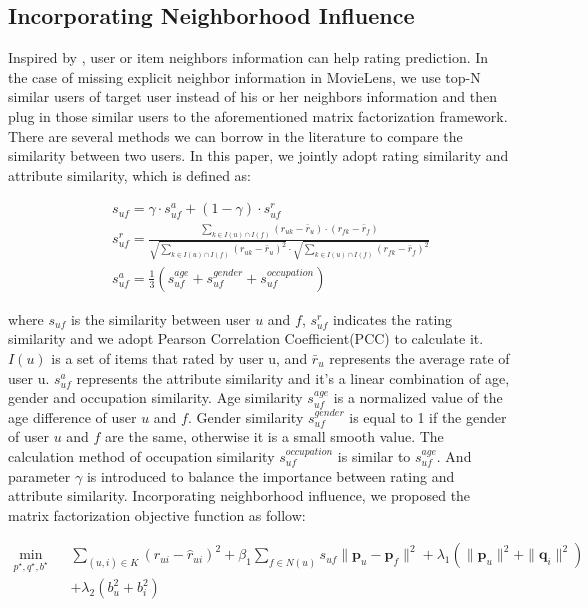 \documentclass{llncs}
\begin{document}
\subsection{Incorporating Neighborhood Influence}
	Inspired by \cite{SIGIR201301,4-2-1}, user or item neighbors information can help rating prediction.
	In the case of missing explicit neighbor information in MovieLens, we
	use top-N similar users of target user instead of his or her neighbors information and
	then plug in those similar users to the aforementioned matrix factorization framework.
	There are several methods we can borrow in the literature
	to compare the similarity between two users. In this paper,
	we jointly adopt rating similarity and attribute similarity, which is defined as:
	
\begin{eqnarray*}
		&&s_{uf}=\gamma\cdot s^a_{uf}+(1-\gamma)\cdot s^r_{uf} \\
        &&s^r_{uf} = \frac {\sum_{k \in I(u)\cap I(f)}(r_{uk} - \bar{r}_u)\cdot(r_{fk}-\bar{r}_f)} {\sqrt{\sum_{k \in I(u)\cap I(f)}(r_{uk} - \bar{r}_u)^2} \cdot \sqrt{\sum_{k \in I(u)\cap I(f)}(r_{fk} - \bar{r}_f)^2} }\\
        &&s^a_{uf} = \frac {1}{3} (s^{age}_{uf} + s^{gender}_{uf} + s^{occupation}_{uf})
	\end{eqnarray*}
	
\noindent where $s_{uf}$ is the similarity between user $u$ and $f$, $s^r_{uf}$ indicates the
	rating similarity and we adopt Pearson Correlation Coefficient(PCC) to calculate it.
$I(u)$ is a set of items that rated by user u, and $\bar{r}_u$ represents the average rate of user u.
$s^a_{uf}$ represents the attribute similarity and it's a linear combination of age, gender and occupation similarity.
    Age similarity $s^{age}_{uf}$ is a normalized value of the age difference of user $u$ and $f$.
    Gender similarity $s^{gender}_{uf}$ is equal to 1 if the gender of user $u$ and $f$ are the same, otherwise it is a small smooth value.
    The calculation method of occupation similarity $s^{occupation}_{uf}$ is similar to $s^{age}_{uf}$.
	And parameter $\gamma$ is introduced to balance the importance between rating and attribute similarity.
	Incorporating neighborhood influence, we proposed the matrix factorization objective function as follow:
	
\begin{eqnarray*}
		\min_{p^\star,q^\star,b^\star} &&\sum_{(u,i)\in K} {(r_{ui}-\hat{r}_{ui})^2}+
		\beta_1\sum_{f \in N(u)}s_{uf}\parallel{\mathbf{p}_u-\mathbf{p}_f}\parallel^2 +\lambda_1(\parallel{\mathbf{p}_u}\parallel^2
        +\parallel{\mathbf{q}_i}\parallel^2) \\
        &&+\lambda_2(b_u^2+b_i^2)
	\end{eqnarray*}
	
\end{document}
